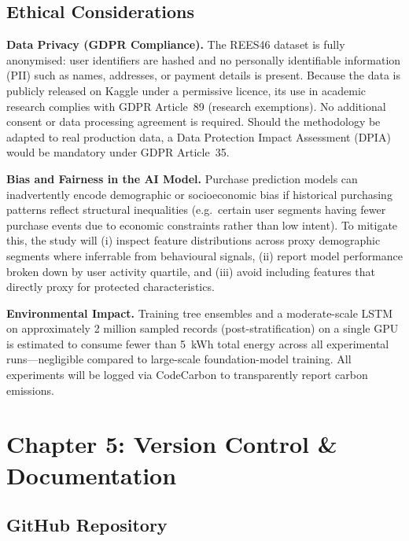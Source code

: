 \documentclass[12pt,a4paper]{article}
\begin{document}
\subsection{Ethical Considerations}

\textbf{Data Privacy (GDPR Compliance).}
The REES46 dataset is fully anonymised: user identifiers are hashed and no personally
identifiable information (PII) such as names, addresses, or payment details is present.
Because the data is publicly released on Kaggle under a permissive licence, its use in
academic research complies with GDPR Article~89 (research exemptions). No additional
consent or data processing agreement is required. Should the methodology be adapted to
real production data, a Data Protection Impact Assessment (DPIA) would be mandatory
under GDPR Article~35.

\textbf{Bias and Fairness in the AI Model.}
Purchase prediction models can inadvertently encode demographic or socioeconomic bias
if historical purchasing patterns reflect structural inequalities (e.g.\ certain user
segments having fewer purchase events due to economic constraints rather than low
intent). To mitigate this, the study will (i) inspect feature distributions across
proxy demographic segments where inferrable from behavioural signals, (ii) report
model performance broken down by user activity quartile, and (iii) avoid including
features that directly proxy for protected characteristics.

\textbf{Environmental Impact.}
Training tree ensembles and a moderate-scale LSTM on approximately 2 million sampled
records (post-stratification) on a single GPU is estimated to consume fewer than 5~kWh
total energy across all experimental runs---negligible compared to large-scale
foundation-model training. All experiments will be logged via CodeCarbon to transparently
report carbon emissions.

\section{Chapter 5: Version Control \& Documentation}

\subsection{GitHub Repository}
\end{document}
